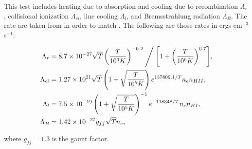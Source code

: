 This test includes heating due to absorption and cooling due to recombination $\Lambda_r$, collisional ionization $\Lambda_{ci}$, line cooling $\Lambda_l$, and Bremsstrahlung radiation $\Lambda_B$. The rate are taken from \citet{cen92} in order to match \citet{petkovaSpringel09}. The following are those rates in ergs cm$^{-3}$ s$^{-1}$:

\begin{align}
\label{eq:cencooling}
\Lambda_r & = {8.7\times 10^{-27} \sqrt{T}\left(\frac{T}{10^3 K}\right)^{-0.2}} \Biggm/{\left[1+\left(\frac{T}{10^6 K}\right)^{0.7}\right]}, \\
\Lambda_{ci} & = 1.27\times 10^{21} \sqrt{T}\left(1 + \sqrt{\frac{T}{10^5 K}}\right)e^{157809.1/T} n_e n_{HII},\\
\Lambda_l & = 7.5\times 10^{-19}\left(1+\sqrt{\frac{T}{10^5 K}}\right)^{-1}e^{-118348/T}n_e n_{HI},\\
\Lambda_B & = 1.42\times 10^{-27}g_{ff}\sqrt{T}n_e,
\end{align}

where $g_{ff} = 1.3$ is the gaunt factor.

